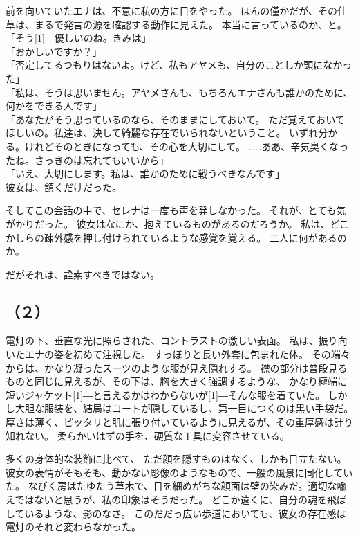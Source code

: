 \documentclass[../IHMain]{subfiles}
\begin{document}
前を向いていたエナは、不意に私の方に目をやった。
ほんの僅かだが、その仕草は、まるで発言の源を確認する動作に見えた。
本当に言っているのか、と。\\
「そう\scalebox{3}[1]{―}優しいのね。きみは」\\
「おかしいですか？」\\
「否定してるつもりはないよ。けど、私もアヤメも、自分のことしか頭になかった」\\
「私は、そうは思いません。アヤメさんも、もちろんエナさんも誰かのために、何かをできる人です」\\
「あなたがそう思っているのなら、そのままにしておいて。
ただ覚えておいてほしいの。私達は、決して綺麗な存在でいられないということ。
いずれ分かる。けれどそのときになっても、その心を大切にして。
……ああ、辛気臭くなったね。さっきのは忘れてもいいから」\\
「いえ、大切にします。私は、誰かのために戦うべきなんです」\\
彼女は、頷くだけだった。

そしてこの会話の中で、セレナは一度も声を発しなかった。
それが、とても気がかりだった。
彼女はなにか、抱えているものがあるのだろうか。
私は、どこかしらの疎外感を押し付けられているような感覚を覚える。
二人に何があるのか。

だがそれは、詮索すべきではない。

\subsection*{（２）}
電灯の下、垂直な光に照らされた、コントラストの激しい表面。
私は、振り向いたエナの姿を初めて注視した。
すっぽりと長い外套に包まれた体。
その端々からは、かなり凝ったスーツのような服が見え隠れする。
襟の部分は普段見るものと同じに見えるが、その下は、胸を大きく強調するような、
かなり極端に短いジャケット\scalebox{3}[1]{―}と言えるかはわからないが\scalebox{3}[1]{―}そんな服を着ていた。
しかし大胆な服装を、結局はコートが隠しているし、第一目につくのは黒い手袋だ。
厚さは薄く、ピッタリと肌に張り付いているように見えるが、その重厚感は計り知れない。
柔らかいはずの手を、硬質な工具に変容させている。

多くの身体的な装飾に比べて、
ただ顔を隠すものはなく、しかも目立たない。
彼女の表情がそもそも、動かない彫像のようなもので、一般の風景に同化していた。
なびく房はたゆたう草木で、目を細めがちな顔面は壁の染みだ。適切な喩えではないと思うが、私の印象はそうだった。
どこか遠くに、自分の魂を飛ばしているような、影のなさ。
このだだっ広い歩道においても、彼女の存在感は電灯のそれと変わらなかった。
\end{document}
